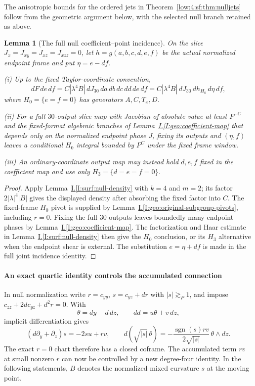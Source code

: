 \documentclass[11pt]{amsart}
\newtheorem{lemma}[theorem]{Lemma}
\theoremstyle{definition}
\theoremstyle{remark}
\numberwithin{equation}{section}
\newcommand{\partIref}[1]{\hyperref[I:#1]{I.\ref*{I:#1}}}
\begin{document}
The anisotropic bounds for the ordered jets in Theorem~\ref{low:4:sf:thm:nulljets} follow from the geometric argument below, with the selected null branch retained as above.

\begin{lemma}[The full null coefficient--point incidence]\label{low:4:sf:null-incidence}
On the slice $J_x=J_{xy}=J_{xz}=J_{xzz}=0$, let $h=g(a,b,c,d,e,f)$ be the actual normalized endpoint frame and put $\eta=e-df$.

\noindent\textup{(i)} Up to the fixed Taylor-coordinate convention,
\begin{equation}\label{low:4:sf:null-density}
dF\,de\,df=C|\lambda^4B|\,dJ_{30}\,da\,db\,dc\,dd\,de\,df
 =C|\lambda^4B|\,dJ_{30}\,dh_{H_0}\,d\eta\,df,
\end{equation}
where $H_0=\{e=f=0\}$ has generators $A,C,T_x,D$.

\noindent\textup{(ii)} For a full $30$-output slice map with Jacobian of absolute value at least $P^{-C}$ and the fixed-format algebraic branches of Lemma~\partIref{geo:coefficient-map} that depends only on the normalized endpoint phase $J$, fixing its outputs and $(\eta,f)$ leaves a conditional $H_0$ integral bounded by $P^C$ under the fixed frame window.

\noindent\textup{(iii)} An ordinary-coordinate output map may instead hold $d,e,f$ fixed in the coefficient map and use only $H_3=\{d=e=f=0\}$.
\end{lemma}
\begin{proof}
Apply Lemma~\partIref{surf:null-density} with $k=4$ and $m=2$; its factor $2|\lambda|^4|B|$ gives the displayed density after absorbing the fixed factor into $C$. The fixed-frame $H_0$ pivot is supplied by Lemma~\partIref{geo:original-subgroup-pivots}, including $r=0$. Fixing the full $30$ outputs leaves boundedly many endpoint phases by Lemma~\partIref{geo:coefficient-map}. The factorization and Haar estimate in Lemma~\partIref{surf:null-density} then give the $H_0$ conclusion, or its $H_3$ alternative when the endpoint shear is external. The substitution $e=\eta+df$ is made in the full joint incidence identity.
\end{proof}

\paragraph{An exact quartic identity controls the accumulated connection}
In null normalization write $r=c_{yy}$, $s=c_{yz}+dr$ with $|s|\gtrsim_P1$, and impose $c_{zz}+2dc_{yz}+d^2r=0$. With
\[
\theta=dy-d\,dz,\qquad dd=u\theta+v\,dz,
\]
implicit differentiation gives
\[
(d\partial_y+\partial_z)s=-2su+rv,
\qquad
d(\sqrt{|s|}\,\theta)
=-\frac{\operatorname{sgn}(s)rv}{2\sqrt{|s|}}\,\theta\wedge dz.
\]
The exact $r=0$ chart therefore has a closed coframe. The accumulated term $rv$ at small nonzero $r$ can now be controlled by a new degree-four identity. In the following statements, $B$ denotes the normalized mixed curvature $s$ at the moving point.
\end{document}
